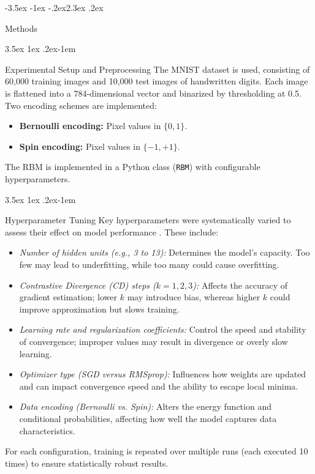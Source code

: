 \documentclass[prl,twocolumn]{revtex4-1}
\makeatletter
\renewcommand{\section}{\@startsection{section}{1}{\z@}%
    {-3.5ex \@plus -1ex \@minus -.2ex}{2.3ex \@plus.2ex}%
    {\normalfont\bfseries\raggedright}}
\renewcommand{\subsection}{\@startsection{subsection}{2}{\z@}%
    {3.5ex \@plus 1ex \@minus .2ex}{-1em}%
    {\normalfont\bfseries\raggedright}}
\makeatother
\begin{document}
\section{Methods}
\label{sec:methodology}

\subsection{Experimental Setup and Preprocessing}
The MNIST dataset is used, consisting of 60,000 training images and 10,000 test images of handwritten digits. Each image is flattened into a 784-dimensional vector and binarized by thresholding at 0.5. Two encoding schemes are implemented:
\begin{itemize}
	\item \textbf{Bernoulli encoding:} Pixel values in $\{0,1\}$.
	\item \textbf{Spin encoding:} Pixel values in $\{-1,+1\}$.
\end{itemize}
The RBM is implemented in a Python class (\texttt{RBM}) with configurable hyperparameters.

\subsection{Hyperparameter Tuning}
Key hyperparameters were systematically varied to assess their effect on model performance \cite{bortoletto,intro_ML,practical}. These include:
\begin{itemize}
	\item \textit{Number of hidden units (e.g., 3 to 13):} Determines the model’s capacity. Too few may lead to underfitting, while too many could cause overfitting.
	\item \textit{Contrastive Divergence (CD) steps ($k=1,2,3$):} Affects the accuracy of gradient estimation; lower $k$ may introduce bias, whereas higher $k$ could improve approximation but slows training.
	\item \textit{Learning rate and regularization coefficients:} Control the speed and stability of convergence; improper values may result in divergence or overly slow learning.
	\item \textit{Optimizer type (SGD versus RMSprop):} Influences how weights are updated and can impact convergence speed and the ability to escape local minima.
	\item \textit{Data encoding (Bernoulli vs. Spin):} Alters the energy function and conditional probabilities, affecting how well the model captures data characteristics.
\end{itemize}
For each configuration, training is repeated over multiple runs (each executed 10 times) to ensure statistically robust results.
\end{document}
